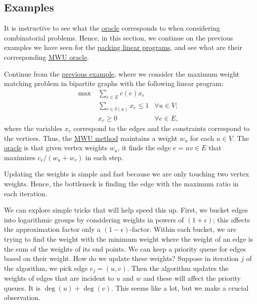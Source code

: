 \subsection{Examples}
It is instructive to see what the \hyperref[eq:MWU-oracle-LP]{oracle} corresponds to when considering combinatorial problems. Hence, in this section, we continue on the previous examples we have seen for the \hyperref[def:packing-LP]{packing linear programs}, and see what are their corresponding \hyperref[eq:MWU-oracle-LP]{MWU oracle}.

\begin{eg}
	Continue from the \hyperref[eg:max-weight-bipartite-matching-MWU]{previous example}, where we consider the maximum weight matching problem in bipartite graphs with the following linear program:
	\[
		\begin{aligned}
			\max~ & \sum_{e \in E} c(e) x_e                                \\
			      & \sum_{e \in \delta (u)} x_e \leq 1 & \forall u \in V ; \\
			      & x_e \geq 0                         & \forall e \in E,
		\end{aligned}
	\]
	where the variables \(x_e\) correspond to the edges and the constraints correspond to the vertices. Thus, the \hyperref[algo:MWU-discrete-non-uniform]{MWU method} maintains a weight \(w_u\) for each \(u \in V\). The \hyperref[eq:MWU-oracle-LP]{oracle} is that given vertex weights \(w_u\), it finds the edge \(e = uv \in E\) that maximizes \(c_e / (w_u + w_v)\) in each step.

	\begin{intuition}
		Updating the weights is simple and fast because we are only touching two vertex weights. Hence, the bottleneck is finding the edge with the maximum ratio in each iteration.
	\end{intuition}

	We can explore simple tricks that will help speed this up. First, we bucket edges into logarithmic groups by considering weights in powers of \((1 + \epsilon )\); this affects the approximation factor only a \((1 - \epsilon )\)-factor. Within each bucket, we are trying to find the weight with the minimum weight where the weight of an edge is the sum of the weights of its end points. We can keep a priority queue for edges based on their weight. How do we update these weights? Suppose in iteration \(j\) of the algorithm, we pick edge \(e_j = (u, v)\). Then the algorithm updates the weights of edges that are incident to \(u\) and \(w\) and these will affect the priority queues. It is \(\deg(u) + \deg(v)\). This seems like a lot, but we make a crucial observation.


\end{eg}
